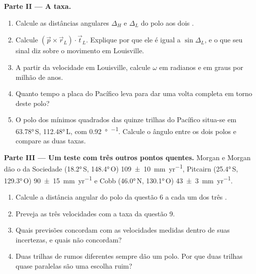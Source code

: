 \begin{problem}
\medskip
\noindent\textbf{Parte II --- A taxa.}
\begin{enumerate}[resume]
  \item Calcule as distâncias angulares $\Delta_H$ e $\Delta_L$ do polo aos dois .
  \item Calcule $(\vec p\times\vec r_L)\cdot\vec t_L$. Explique por que ele é igual a
        $\sin\Delta_L$, e o que seu sinal diz sobre o movimento em Louisville.
  \item A partir da velocidade em Louisville, calcule $\omega$ em radianos e em graus por milhão de anos.
  \item Quanto tempo a placa do Pacífico leva para dar uma volta completa em torno deste polo?
  \item O polo dos mínimos quadrados das quinze trilhas do Pacífico situa-se em
        \ang{63.78}\,S, \ang{112.48}\,L, com \qty{0.92}{\degree\per\Myr}. Calcule o ângulo entre os dois polos e compare as duas taxas.
\end{enumerate}

\medskip
\noindent\textbf{Parte III --- Um teste com três outros pontos quentes.} Morgan e Morgan dão o  da Sociedade (\ang{18.2}\,S, \ang{148.4}\,O)
\qty[uncertainty-mode=separate]{109 \pm 10}{mm.yr^{-1}}, Pitcairn
(\ang{25.4}\,S, \ang{129.3}\,O)
\qty[uncertainty-mode=separate]{90 \pm 15}{mm.yr^{-1}} e Cobb
(\ang{46.0}\,N, \ang{130.1}\,O)
\qty[uncertainty-mode=separate]{43 \pm 3}{mm.yr^{-1}}.
\begin{enumerate}[resume]
  \item Calcule a distância angular do polo da questão 6 a cada um dos três .
  \item Preveja as três velocidades com a taxa da questão 9.
  \item Quais previsões concordam com as velocidades medidas dentro de suas incertezas, e quais não concordam?
  \item Duas trilhas de rumos diferentes sempre dão um polo. Por que duas trilhas quase paralelas são uma escolha ruim?
\end{enumerate}


\end{problem}
